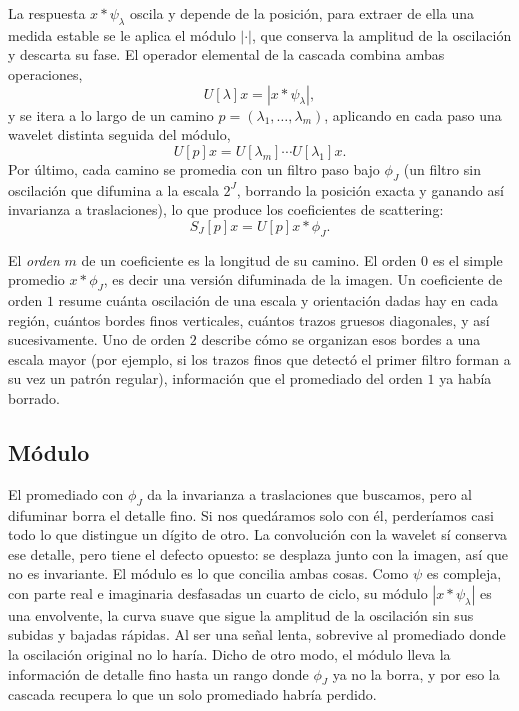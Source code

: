 \documentclass[twocolumn,10pt,a4paper]{article}
\newcommand{\abs}[1]{\left\lvert #1 \right\rvert}
\begin{document}
La respuesta $x * \psi_\lambda$ oscila y depende de la posición, para extraer de
ella una medida estable se le aplica el módulo $\abs{\cdot}$, que conserva
la amplitud de la oscilación y descarta su fase. El operador elemental de la
cascada combina ambas operaciones,
\begin{equation}
  U[\lambda]x = \abs{x * \psi_\lambda},
\end{equation}
y se itera a lo largo de un camino $p = (\lambda_1,\dots,\lambda_m)$,
aplicando en cada paso una wavelet distinta seguida del módulo,
\begin{equation}
  U[p]x = U[\lambda_m]\cdots U[\lambda_1]x .
\end{equation}
Por último, cada camino se promedia con un filtro paso bajo $\phi_J$ (un
filtro sin oscilación que difumina a la escala $2^J$, borrando la posición exacta
y ganando así invarianza a traslaciones), lo que produce los coeficientes
de scattering:
\begin{equation}
  S_J[p]x = U[p]x * \phi_J .
  \label{eq:scattering}
\end{equation}

El \emph{orden} $m$ de un coeficiente es la longitud de su camino. El orden $0$
es el simple promedio $x*\phi_J$, es decir una versión difuminada de la imagen.
Un coeficiente de orden $1$ resume cuánta oscilación de una escala y orientación
dadas hay en cada región, cuántos bordes finos verticales, cuántos trazos
gruesos diagonales, y así sucesivamente. Uno de orden $2$
describe cómo se organizan esos bordes a una escala mayor (por ejemplo, si los
trazos finos que detectó el primer filtro forman a su vez un patrón regular),
información que el promediado del orden $1$ ya había borrado.

\subsection{Módulo}

El promediado con $\phi_J$ da la invarianza a traslaciones que buscamos, pero al
difuminar borra el detalle fino. Si nos quedáramos solo con él, perderíamos casi
todo lo que distingue un dígito de otro. La convolución con la wavelet sí
conserva ese detalle, pero tiene el defecto opuesto: se desplaza junto con la
imagen, así que no es invariante. El módulo es lo que concilia ambas cosas. Como
$\psi$ es compleja, con parte real e imaginaria desfasadas un cuarto de ciclo, su
módulo $\abs{x * \psi_\lambda}$ es una
envolvente, la curva suave que sigue la amplitud de la oscilación sin sus
subidas y bajadas rápidas. Al ser una señal lenta, sobrevive al promediado donde
la oscilación original no lo haría. Dicho de otro modo, el módulo lleva la
información de detalle fino hasta un rango donde $\phi_J$ ya no la borra, y por
eso la cascada recupera lo que un solo promediado habría perdido.
\end{document}
